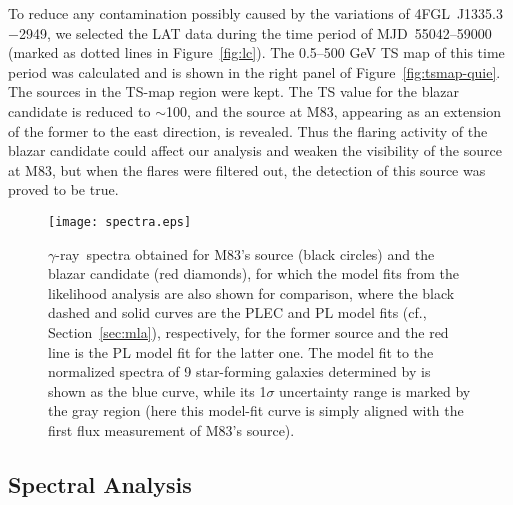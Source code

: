 \documentclass[twocolumn]{aastex631}
\newcommand{\gr}{$\gamma$-ray}
\begin{document}
To reduce any contamination possibly caused by the variations of 
4FGL~J1335.3$-$2949, we selected the LAT data during the time period 
of MJD~55042--59000 (marked as dotted lines in Figure~\ref{fig:lc}).
The 0.5--500 GeV TS map of this time period was calculated and 
is shown in the right panel of Figure~\ref{fig:tsmap-quie}. 
The sources in the TS-map region were kept.
The TS value for the blazar candidate is reduced to $\sim$100, and
the source at M83, appearing as an extension of the former to the east 
direction, is revealed. Thus the flaring activity of the blazar candidate
could affect our analysis and weaken the visibility of the source at M83,
but when the flares were filtered out, the detection of this source was
proved to be true.
\begin{figure}
   \centering
   \texttt{[image: spectra.eps]}
	\caption{\gr\ spectra obtained for M83's source (black circles) and 
	the blazar candidate (red diamonds), for which the model fits from 
	the likelihood analysis are also shown for comparison, where
	the black dashed and solid curves are the PLEC and PL model fits 
	(cf., Section~\ref{sec:mla}), respectively, for the former source 
	and the red line is the PL model fit for the latter one.
	The model fit to the 
	normalized spectra of 9 star-forming galaxies determined by
	\citet{aje+20} is shown as the blue curve, while its 1$\sigma$
	uncertainty range is marked by the gray region (here  
	this model-fit curve is simply aligned with the first 
	flux measurement of M83's source).
}
   \label{fig:spectra}
\end{figure}

\subsection{Spectral Analysis}
\label{sec:sa}
\end{document}
